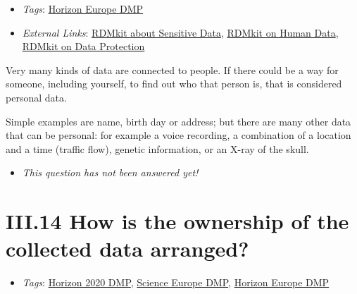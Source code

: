 \documentclass[a4paper,12pt]{report}
\begin{document}
\label{b1df3c74-0b1f-4574-81c4-4cc2d780c1af.49c009cb-a38c-4836-9780-8a8b3dd1cbac}


\begin{itemize}
  \item \textit{Tags}: \ul{Horizon Europe DMP}
  
  \item \textit{External Links}: \href{https://rdmkit.elixir-europe.org/sensitive_data.html}{RDMkit about Sensitive Data}, \href{https://rdmkit.elixir-europe.org/human_data.html}{RDMkit on Human Data}, \href{https://rdmkit.elixir-europe.org/data_protection.html}{RDMkit on Data Protection}\end{itemize}


\noindent
\begin{markdown}
Very many kinds of data are connected to people. If there could be a way for someone, including yourself, to find out who that person is, that is considered personal data.

Simple examples are name, birth day or address; but there are many other data that can be personal: for example a voice recording, a combination of a location and a time (traffic flow), genetic information, or an X-ray of the skull.
\end{markdown}



\begin{itemize}
  \item[\XSolidBrush] \textit{This question has not been answered yet!}
\end{itemize}
  


\section*{\protect\textcolor{colorSecId}{III.14} How is the ownership of the collected data arranged?}

\label{b1df3c74-0b1f-4574-81c4-4cc2d780c1af.cb7d17a8-30c0-489d-a43c-702b27d97611}


\begin{itemize}
  \item \textit{Tags}: \ul{Horizon 2020 DMP}, \ul{Science Europe DMP}, \ul{Horizon Europe DMP}
  \end{itemize}
\end{document}

